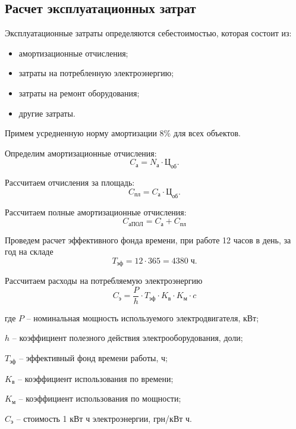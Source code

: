     \subsection{Расчет эксплуатационных затрат}

        Эксплуатационные затраты определяются себестоимостью, которая состоит
        из:
        \begin{itemize}
            \item амортизационные отчисления;
            \item затраты на потребленную электроэнергию;
            \item затраты на ремонт оборудования;
            \item другие затраты.
        \end{itemize}

        Примем усредненную норму амортизации 8\% для всех объектов.

        Определим амортизационные отчисления:
        \begin{equation}
            C_\text{а} = N_\text{а} \cdot \text{Ц}_\text{об}.
        \end{equation}

        Рассчитаем отчисления за площадь:
        \begin{equation}
            C_\text{пл} = C_\text{а} \cdot \text{Ц}_\text{об}.
        \end{equation}

        Рассчитаем полные амортизационные отчисления:
        \begin{equation}
            C_\text{аПОЛ}  = C_\text{а} + C_\text{пл} 
        \end{equation}

        Проведем расчет эффективного фонда времени, при работе 12 часов в
        день, за год на складе
        \begin{equation}
            T_\text{эф} = 12 \cdot 365 = 4380 \; \text{ч}. 
        \end{equation}

        Рассчитаем расходы на потребляемую электроэнергию
        \begin{equation}
            C_\text{э} = \frac{P}{h} \cdot
                T_\text{эф} \cdot K_\text{в} \cdot K_\text{м} \cdot c 
        \end{equation}

        где  $P$ – номинальная мощность используемого
            электродвигателя, кВт;\par
        $h$ – коэффициент полезного действия электрооборудования,
            доли;\par
        $T_\text{эф}$ – эффективный фонд времени работы, ч;\par
        $K_\text{в}$ – коэффициент использования по времени;\par
        $K_\text{м}$ – коэффициент использования по мощности;\par
        $C_\text{э}$ – стоимость 1 кВт ч электроэнергии, грн/кВт ч.\par

